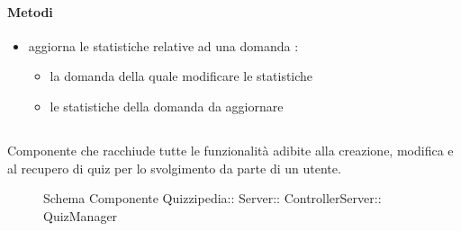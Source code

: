 \paragraph{Metodi}
\begin{itemize}
\item {}
\newline
aggiorna le statistiche relative ad una domanda
\newline
{} :
\begin{itemize}
\item {}
\newline
la domanda della quale modificare le statistiche
\item {}
\newline
le statistiche della domanda da aggiornare
\end{itemize}
\end{itemize}
\subsection{}
Componente che racchiude tutte le funzionalità adibite alla creazione, modifica e al recupero di quiz per lo svolgimento da parte di un utente.
\begin{figure}[H]
\centering
\noindent{}
\caption[Schema Componente Quizzipedia::Server::ControllerServer::QuizManager]{Schema Componente Quizzipedia:: Server:: ControllerServer:: QuizManager}
\end{figure}
